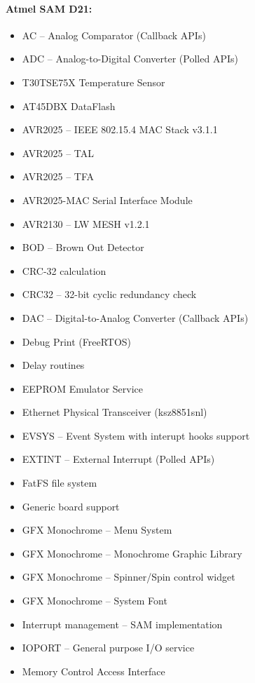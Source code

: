 \paragraph{Atmel SAM D21:} \cite{AtmelSAMd20API}
\begin{multicols}{2}
\begin{flushleft}
\begin{itemize}
	\setlength\itemsep{1pt}
	\item AC -- Analog Comparator (Callback APIs)
	\item ADC -- Analog-to-Digital Converter (Polled APIs)
	\item T30TSE75X Temperature Sensor
	\item AT45DBX DataFlash
	\item AVR2025 -- IEEE 802.15.4 MAC Stack v3.1.1
	\item AVR2025 -- TAL
	\item AVR2025 -- TFA
	\item AVR2025-MAC Serial Interface Module
	\item AVR2130 -- LW MESH v1.2.1
	\item BOD -- Brown Out Detector
	\item CRC-32 calculation
	\item CRC32 -- 32-bit cyclic redundancy check
	\item DAC -- Digital-to-Analog Converter (Callback APIs)
	\item Debug Print (FreeRTOS)
	\item Delay routines
	\item EEPROM Emulator Service
	\item Ethernet Physical Transceiver (ksz8851snl)
	\item EVSYS -- Event System with interupt hooks support
	\item EXTINT -- External Interrupt (Polled APIs)
	\item FatFS file system
	\item Generic board support
	\item GFX Monochrome -- Menu System
	\item GFX Monochrome -- Monochrome Graphic Library
	\item GFX Monochrome -- Spinner/Spin control widget
	\item GFX Monochrome -- System Font
	\item Interrupt management -- SAM implementation
	\item IOPORT -- General purpose I/O service
	\item Memory Control Access Interface

\end{itemize}
\end{flushleft}
\end{multicols}
